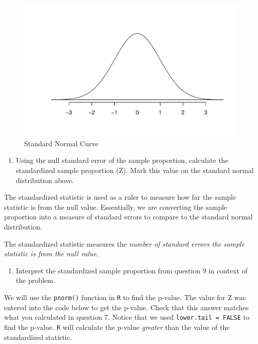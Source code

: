 \documentclass[
]{report}
\providecommand{\tightlist}{%
  \setlength{\itemsep}{0pt}\setlength{\parskip}{0pt}}
\begin{document}
\vspace{2mm}

\begin{figure}

{\centering \includegraphics[width=0.5\linewidth]{04-A09-inference-1cat-theory_files/figure-latex/Normcur-1} 

}

\caption{Standard Normal Curve}\label{fig:Normcur}
\end{figure}

\begin{enumerate}
\def\labelenumi{\arabic{enumi}.}
\setcounter{enumi}{8}
\tightlist
\item
  Using the null standard error of the sample proportion, calculate the standardized sample proportion (Z). Mark this value on the standard normal distribution above.
\end{enumerate}

\vspace{0.6in}

The standardized statistic is used as a ruler to measure how far the sample statistic is from the null value. Essentially, we are converting the sample proportion into a measure of standard errors to compare to the standard normal distribution.

The standardized statistic measures the \emph{number of standard errors the sample statistic is from the null value}.

\begin{enumerate}
\def\labelenumi{\arabic{enumi}.}
\setcounter{enumi}{9}
\tightlist
\item
  Interpret the standardized sample proportion from question 9 in context of the problem.
\end{enumerate}

\vspace{.8in}

We will use the \texttt{pnorm()} function in \texttt{R} to find the p-value. The value for Z was entered into the code below to get the p-value. Check that this answer matches what you calculated in question 7. Notice that we used \texttt{lower.tail\ =\ FALSE} to find the p-value. \texttt{R} will calculate the p-value \emph{greater} than the value of the standardized statistic.
\end{document}
